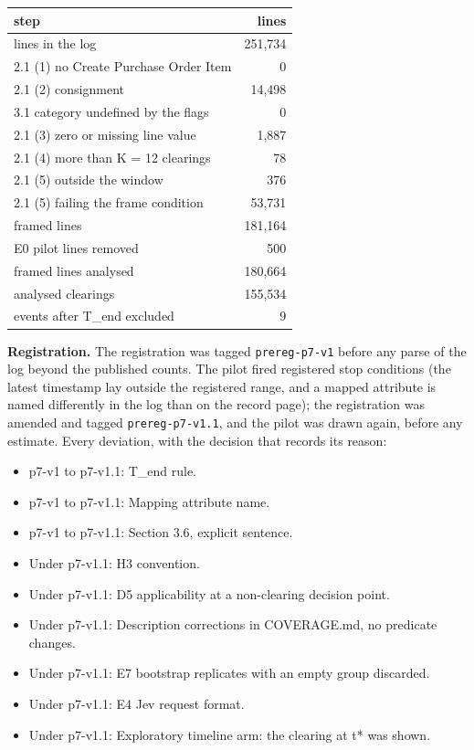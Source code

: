 \documentclass[
  10pt,
]{article}
\providecommand{\tightlist}{%
  \setlength{\itemsep}{0pt}\setlength{\parskip}{0pt}}
\begin{document}
\begin{longtable}[]{@{}lr@{}}
\toprule\noalign{}
step & lines \\
\midrule\noalign{}
\endhead
\bottomrule\noalign{}
\endlastfoot
lines in the log & 251,734 \\
2.1 (1) no Create Purchase Order Item & 0 \\
2.1 (2) consignment & 14,498 \\
3.1 category undefined by the flags & 0 \\
2.1 (3) zero or missing line value & 1,887 \\
2.1 (4) more than K = 12 clearings & 78 \\
2.1 (5) outside the window & 376 \\
2.1 (5) failing the frame condition & 53,731 \\
framed lines & 181,164 \\
E0 pilot lines removed & 500 \\
framed lines analysed & 180,664 \\
analysed clearings & 155,534 \\
events after T\_end excluded & 9 \\
\end{longtable}

\textbf{Registration.} The registration was tagged \texttt{prereg-p7-v1}
before any parse of the log beyond the published counts. The pilot fired
registered stop conditions (the latest timestamp lay outside the
registered range, and a mapped attribute is named differently in the log
than on the record page); the registration was amended and tagged
\texttt{prereg-p7-v1.1}, and the pilot was drawn again, before any
estimate. Every deviation, with the decision that records its reason:

\begin{itemize}
\tightlist
\item
  p7-v1 to p7-v1.1: T\_end rule.
\item
  p7-v1 to p7-v1.1: Mapping attribute name.
\item
  p7-v1 to p7-v1.1: Section 3.6, explicit sentence.
\item
  Under p7-v1.1: H3 convention.
\item
  Under p7-v1.1: D5 applicability at a non-clearing decision point.
\item
  Under p7-v1.1: Description corrections in COVERAGE.md, no predicate
  changes.
\item
  Under p7-v1.1: E7 bootstrap replicates with an empty group discarded.
\item
  Under p7-v1.1: E4 Jev request format.
\item
  Under p7-v1.1: Exploratory timeline arm: the clearing at t* was shown.
\end{itemize}
\end{document}
